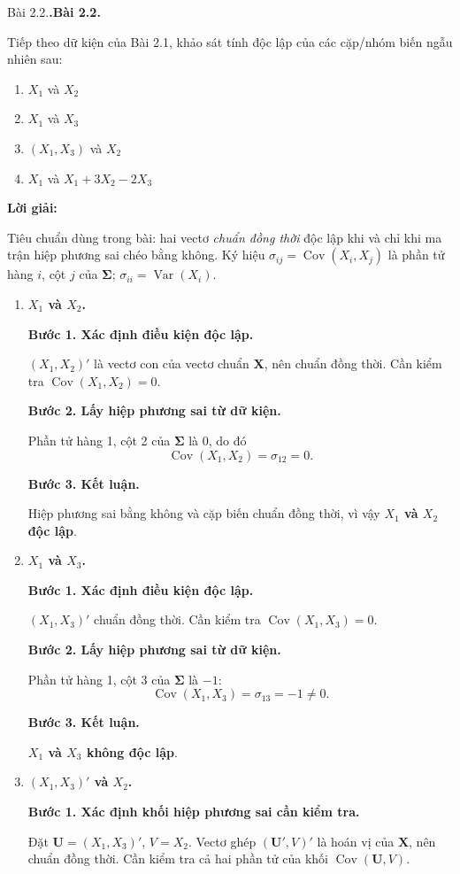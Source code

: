 \documentclass[11pt,a4paper]{article}
\makeatletter
\renewcommand{\boldsymbol}[1]{\symbf{#1}}
\newcounter{prob}
\newenvironment{problem}[1][]{%
  \par\medskip\noindent
  \def\@tempa{#1}%
  \ifx\@tempa\@empty\refstepcounter{prob}\textbf{\theprob.}\else\textbf{#1}\fi
  \ \ignorespaces
}{\par}
\newenvironment{solution}{%
  \par\medskip\noindent\textbf{Lời giải:}\par\nopagebreak[4]\smallskip\noindent\ignorespaces
}{\par}
\newcommand{\step}[2]{\par\medskip\noindent\textbf{Bước #1. #2}\par\nopagebreak[4]\smallskip\noindent}
\makeatother
\begin{document}
\begin{problem}[Bài 2.2.]
Tiếp theo dữ kiện của Bài 2.1, khảo sát tính độc lập của các cặp/nhóm biến ngẫu nhiên sau:
\begin{enumerate}[label=\alph*)]
  \item $X_1$ và $X_2$
  \item $X_1$ và $X_3$
  \item $(X_1, X_3)$ và $X_2$
  \item $X_1$ và $X_1 + 3X_2 - 2X_3$
\end{enumerate}
\end{problem}

\begin{solution}
Tiêu chuẩn dùng trong bài: hai vectơ \emph{chuẩn đồng thời} độc lập
khi và chỉ khi ma trận hiệp phương sai chéo bằng không.
Ký hiệu $\sigma_{ij}=\operatorname{Cov}(X_i,X_j)$ là phần tử hàng $i$, cột $j$
của $\boldsymbol{\Sigma}$; $\sigma_{ii}=\operatorname{Var}(X_i)$.
\begin{enumerate}[label=\textbf{\alph*)}]
\item \textbf{$X_1$ và $X_2$.}\par\nopagebreak[4]
\step{1}{Xác định điều kiện độc lập.}
$(X_1,X_2)'$ là vectơ con của vectơ chuẩn $\mathbf{X}$, nên chuẩn đồng thời.
Cần kiểm tra $\operatorname{Cov}(X_1,X_2)=0$.
\step{2}{Lấy hiệp phương sai từ dữ kiện.}
Phần tử hàng 1, cột 2 của $\boldsymbol{\Sigma}$ là $0$, do đó
\[
\operatorname{Cov}(X_1,X_2)=\sigma_{12}=0.
\]
\step{3}{Kết luận.}
Hiệp phương sai bằng không và cặp biến chuẩn đồng thời,
vì vậy \textbf{$X_1$ và $X_2$ độc lập}.
\item \textbf{$X_1$ và $X_3$.}\par\nopagebreak[4]
\step{1}{Xác định điều kiện độc lập.}
$(X_1,X_3)'$ chuẩn đồng thời. Cần kiểm tra $\operatorname{Cov}(X_1,X_3)=0$.
\step{2}{Lấy hiệp phương sai từ dữ kiện.}
Phần tử hàng 1, cột 3 của $\boldsymbol{\Sigma}$ là $-1$:
\[
\operatorname{Cov}(X_1,X_3)=\sigma_{13}=-1\ne0.
\]
\step{3}{Kết luận.}
\textbf{$X_1$ và $X_3$ không độc lập}.
\item \textbf{$(X_1,X_3)'$ và $X_2$.}\par\nopagebreak[4]
\step{1}{Xác định khối hiệp phương sai cần kiểm tra.}
Đặt $\mathbf{U}=(X_1,X_3)'$, $V=X_2$.
Vectơ ghép $(\mathbf{U}',V)'$ là hoán vị của $\mathbf{X}$, nên chuẩn đồng thời.
Cần kiểm tra cả hai phần tử của khối $\operatorname{Cov}(\mathbf{U},V)$.

\end{enumerate}
\end{solution}
\end{document}
